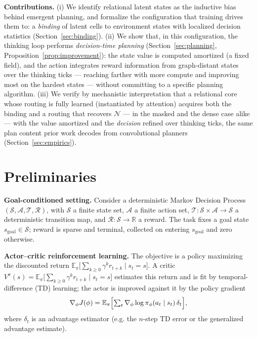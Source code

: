 \documentclass{article} %
\theoremstyle{plain}
\theoremstyle{definition}
\begin{document}
\textbf{Contributions.} (i) We identify relational latent states as the
inductive bias behind emergent planning, and formalize the configuration that
training drives them to: a \emph{binding} of latent cells to environment
states with localized decision statistics (Section~\ref{sec:binding}).
(ii) We show that, in this configuration, the thinking loop performs
\emph{decision-time planning} (Section~\ref{sec:planning},
Proposition~\ref{prop:improvement}): the state value is computed amortized (a fixed
field), and the action integrates reward information from graph-distant states over
the thinking ticks --- reaching farther with more compute and improving most on the
hardest states --- without committing to a specific planning algorithm.
(iii) We verify by mechanistic interpretation that a relational core whose
routing is fully learned (instantiated by attention) acquires both the binding
and a routing that recovers $\mathcal N$ --- in the masked and the dense case
alike --- with the value amortized and the \emph{decision} refined over thinking
ticks, the same plan content prior work decodes from convolutional planners
(Section~\ref{sec:empirics}).



\section{Preliminaries}
\label{sec:prelim}

\textbf{Goal-conditioned setting.} Consider a deterministic Markov Decision
Process $(\mathcal S,\mathcal A,\mathcal T,\mathcal R)$, with $\mathcal S$ a
finite state set, $\mathcal A$ a finite action set,
$\mathcal T:\mathcal S\times\mathcal A\to\mathcal S$ a deterministic transition
map, and $\mathcal R:\mathcal S\to\mathbb R$ a reward. The task fixes a goal
state $s_{\text{goal}}\in\mathcal S$; reward is sparse and terminal, collected
on entering $s_{\text{goal}}$ and zero otherwise.

\textbf{Actor--critic reinforcement learning.} The objective is a policy
maximizing the discounted return
$\mathbb E_\pi\bigl[\sum_{k\geq 0}\gamma^k r_{t+k}\mid s_t=s\bigr]$. A critic
$V^\pi(s)=\mathbb E_\pi\bigl[\sum_{k\geq 0}\gamma^k r_{t+k}\mid s_t=s\bigr]$
estimates this return and is fit by temporal-difference (TD) learning; the
actor is improved against it by the policy gradient
\begin{align}
  \nabla_\phi J(\phi) = \mathbb E_\pi\Bigl[\textstyle\sum_{t}
  \nabla_\phi\log\pi_\phi(a_t\mid s_t)\,\delta_t\Bigr],
\end{align}
where $\delta_t$ is an advantage estimator (e.g. the $n$-step TD error or the
generalized advantage estimate).
\end{document}
